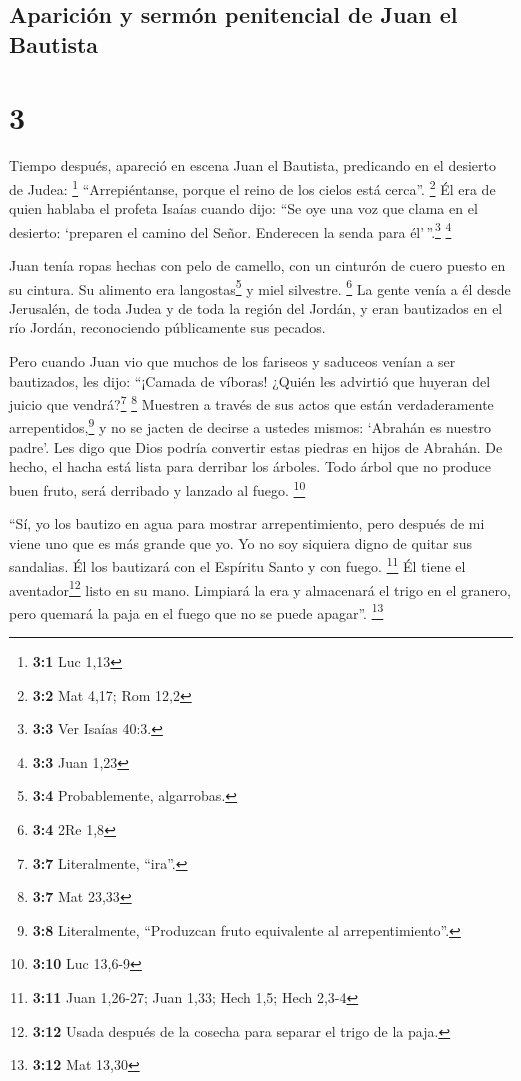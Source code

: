 \hypertarget{apariciuxf3n-y-sermuxf3n-penitencial-de-juan-el-bautista}{%
\subsection{Aparición y sermón penitencial de Juan el
Bautista}\label{apariciuxf3n-y-sermuxf3n-penitencial-de-juan-el-bautista}}

\hypertarget{section-2}{%
\section{3}\label{section-2}}

 Tiempo después, apareció en escena Juan el Bautista,
predicando en el desierto de Judea: \footnote{\textbf{3:1} Luc 1,13}
 ``Arrepiéntanse, porque el reino de los cielos está
cerca''. \footnote{\textbf{3:2} Mat 4,17; Rom 12,2}  Él
era de quien hablaba el profeta Isaías cuando dijo: ``Se oye una voz que
clama en el desierto: `preparen el camino del Señor. Enderecen la senda
para él'\,''.\footnote{\textbf{3:3} Ver Isaías 40:3.} \footnote{\textbf{3:3}
  Juan 1,23}

 Juan tenía ropas hechas con pelo de camello, con un
cinturón de cuero puesto en su cintura. Su alimento era
langostas\footnote{\textbf{3:4} Probablemente, algarrobas.} y miel
silvestre. \footnote{\textbf{3:4} 2Re 1,8}  La gente venía
a él desde Jerusalén, de toda Judea y de toda la región del Jordán,
 y eran bautizados en el río Jordán, reconociendo
públicamente sus pecados.

 Pero cuando Juan vio que muchos de los fariseos y
saduceos venían a ser bautizados, les dijo: ``¡Camada de víboras! ¿Quién
les advirtió que huyeran del juicio que vendrá?\footnote{\textbf{3:7}
  Literalmente, ``ira''.} \footnote{\textbf{3:7} Mat 23,33}
 Muestren a través de sus actos que están verdaderamente
arrepentidos,\footnote{\textbf{3:8} Literalmente, ``Produzcan fruto
  equivalente al arrepentimiento''.}  y no se jacten de
decirse a ustedes mismos: `Abrahán es nuestro padre'. Les digo que Dios
podría convertir estas piedras en hijos de Abrahán.  De
hecho, el hacha está lista para derribar los árboles. Todo árbol que no
produce buen fruto, será derribado y lanzado al fuego. \footnote{\textbf{3:10}
  Luc 13,6-9}

 ``Sí, yo los bautizo en agua para mostrar
arrepentimiento, pero después de mi viene uno que es más grande que yo.
Yo no soy siquiera digno de quitar sus sandalias. Él los bautizará con
el Espíritu Santo y con fuego. \footnote{\textbf{3:11} Juan 1,26-27;
  Juan 1,33; Hech 1,5; Hech 2,3-4}  Él tiene el
aventador\footnote{\textbf{3:12} Usada después de la cosecha para
  separar el trigo de la paja.} listo en su mano. Limpiará la era y
almacenará el trigo en el granero, pero quemará la paja en el fuego que
no se puede apagar''. \footnote{\textbf{3:12} Mat 13,30}

